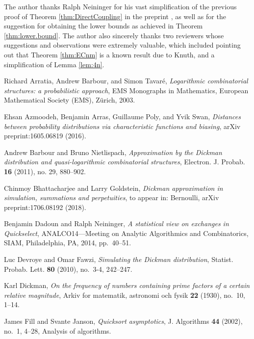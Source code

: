 \documentclass[12pt]{article}
\begin{document}
 The author thanks Ralph Neininger for his vast simplification of the previous proof of Theorem \ref{thm:DirectCoupling} in the preprint \cite{goldstein2017non}, as well as for the suggestion for obtaining the lower bounds as achieved in Theorem \ref{thm:lower.bound}. The author also sincerely thanks two reviewers whose suggestions and observations were extremely valuable, which included pointing out that Theorem \ref{thm:ECnm} is a known result due to Knuth, and a simplification of Lemma \ref{lem:4n}. 

\begin{thebibliography}{10}
	
	Richard Arratia, Andrew Barbour, and Simon Tavar\'{e}, \emph{Logarithmic
		combinatorial structures: a probabilistic approach}, EMS Monographs in
	Mathematics, European Mathematical Society (EMS), Z\"{u}rich, 2003.
	
	Ehsan Azmoodeh, Benjamin Arras, Guillaume Poly, and Yvik Swan, \emph{Distances
		between probability distributions via characteristic functions and biasing},
	arXiv preprint:1605.06819 (2016).
	
	Andrew Barbour and Bruno Nietlispach, \emph{Approximation by the {D}ickman
		distribution and quasi-logarithmic combinatorial structures}, Electron. J.
	Probab. \textbf{16} (2011), no. 29, 880--902. %
	
	Chinmoy Bhattacharjee and Larry Goldstein, \emph{Dickman approximation in
		simulation, summations and perpetuities}, to appear in: Bernoulli, arXiv
	preprint:1706.08192 (2018).
	
	Benjamin Dadoun and Ralph Neininger, \emph{A statistical view on exchanges in
		{Q}uickselect}, A{NALCO}14---{M}eeting on {A}nalytic {A}lgorithmics and
	{C}ombinatorics, SIAM, Philadelphia, PA, 2014, pp.~40--51. %
	
	Luc Devroye and Omar Fawzi, \emph{Simulating the {D}ickman distribution},
	Statist. Probab. Lett. \textbf{80} (2010), no.~3-4, 242--247. %
	
	Karl Dickman, \emph{On the frequency of numbers containing prime factors of a
		certain relative magnitude}, Arkiv for matematik, astronomi och fysik
	\textbf{22} (1930), no.~10, 1--14.
	
	James Fill and Svante Janson, \emph{Quicksort asymptotics}, J. Algorithms
	\textbf{44} (2002), no.~1, 4--28, Analysis of algorithms. %
	

\end{thebibliography}
\end{document}
